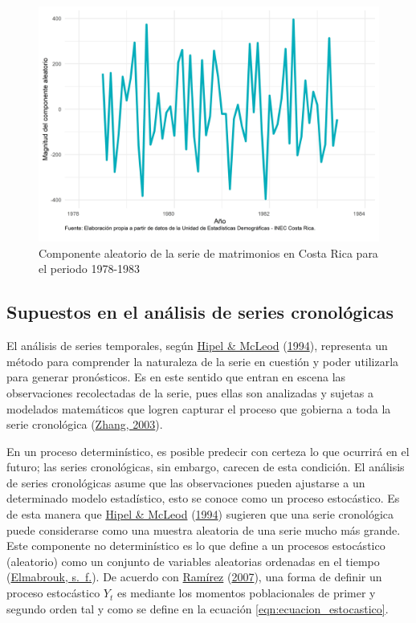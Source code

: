 \documentclass[
]{article}
\begin{document}
\begin{figure}[!h]
\includegraphics[width=1\linewidth,height=1\textheight]{Tesis_files/figure-latex/ejemplo_aleatorio-1} \caption{Componente aleatorio de la serie de matrimonios en Costa Rica para el periodo 1978-1983}\label{fig:ejemplo_aleatorio}
\end{figure}

\subsection{Supuestos en el análisis de series cronológicas}

El análisis de series temporales, según
\protect\hyperlink{ref-Hipel}{Hipel \& McLeod}
(\protect\hyperlink{ref-Hipel}{1994}), representa un método para
comprender la naturaleza de la serie en cuestión y poder utilizarla para
generar pronósticos. Es en este sentido que entran en escena las
observaciones recolectadas de la serie, pues ellas son analizadas y
sujetas a modelados matemáticos que logren capturar el proceso que
gobierna a toda la serie cronológica
(\protect\hyperlink{ref-Zhang}{Zhang, 2003}).

En un proceso determinístico, es posible predecir con certeza lo que
ocurrirá en el futuro; las series cronológicas, sin embargo, carecen de
esta condición. El análisis de series cronológicas asume que las
observaciones pueden ajustarse a un determinado modelo estadístico, esto
se conoce como un proceso estocástico. Es de esta manera que
\protect\hyperlink{ref-Hipel}{Hipel \& McLeod}
(\protect\hyperlink{ref-Hipel}{1994}) sugieren que una serie cronológica
puede considerarse como una muestra aleatoria de una serie mucho más
grande. Este componente no determinístico es lo que define a un procesos
estocástico (aleatorio) como un conjunto de variables aleatorias
ordenadas en el tiempo
(\protect\hyperlink{ref-definicion_estocastico}{Elmabrouk, s.~f.}). De
acuerdo con \protect\hyperlink{ref-introduccion_series}{Ramírez}
(\protect\hyperlink{ref-introduccion_series}{2007}), una forma de
definir un proceso estocástico \(Y_t\) es mediante los momentos
poblacionales de primer y segundo orden tal y como se define en la
ecuación \ref{eqn:ecuacion_estocastico}.
\end{document}
